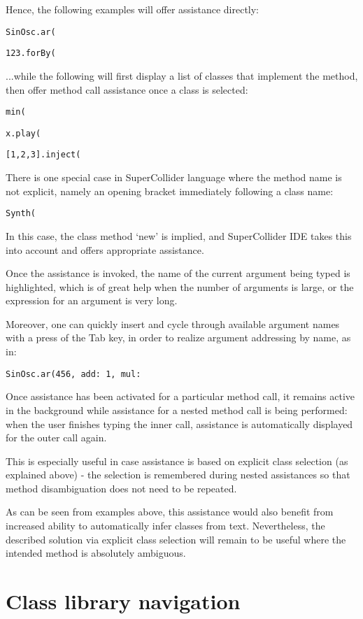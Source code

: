 \documentclass[11pt,a4paper]{article}
\begin{document}
Hence, the following examples will offer assistance directly:

\verb|SinOsc.ar(|

\verb|123.forBy(|

...while the following will first display a list of classes that implement the method, then offer
method call assistance once a class is selected:

\verb|min(|

\verb|x.play(|

\verb|[1,2,3].inject(|

There is one special case in SuperCollider language where the method name is not explicit, namely
an opening bracket immediately following a class name:

\verb|Synth(|

In this case, the class method `new' is implied, and SuperCollider IDE takes this into account and
offers appropriate assistance.

Once the assistance is invoked, the name of the current argument being typed is highlighted, which
is of great help when the number of arguments is large, or the expression for an argument is very
long.

Moreover, one can quickly insert and cycle through available argument names with a press of the Tab
key, in order to realize argument addressing by name, as in:

\verb|SinOsc.ar(456, add: 1, mul:|

Once assistance has been activated for a particular method call, it remains active in the
background while assistance for a nested method call is being performed: when the user
finishes typing the inner call, assistance is automatically displayed for the outer call again.

This is especially useful in case assistance is based on explicit class selection (as explained
above) - the selection is remembered during nested assistances so that method disambiguation does
not need to be repeated.

As can be seen from examples above, this assistance would also benefit from increased ability to
automatically infer classes from text. Nevertheless, the described solution via explicit class
selection will remain to be useful where the intended method is absolutely ambiguous.

\section{Class library navigation}
\end{document}
